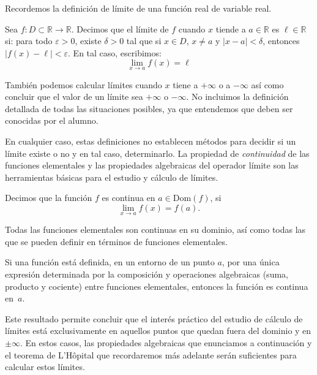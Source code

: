 Recordemos la definición de límite de una función real de variable real.
%
\begin{definicion}
Sea $f\colon D\subset\mathbb{R}\to\mathbb{R}$. Decimos que el límite de $f$ cuando $x$ tiende a $a\in\mathbb{R}$ es $\ell\in\mathbb{R}$ si: para todo $\varepsilon>0$, existe $\delta>0$ tal que si $x\in D$, $x\ne a$ y $|x-a|<\delta$, entonces
$|f(x)-\ell|<\varepsilon$.
En tal caso, escribimos:
\[
\lim_{x\to a}f(x)=\ell
\]
\end{definicion}

También podemos calcular límites cuando $x$ tiene a $+\infty$ o a $-\infty$ así como concluir que el valor de un límite sea $+\infty$ o $-\infty$.
No incluimos la definición detallada de todas las situaciones posibles, ya que entendemos que deben ser conocidas por el alumno.

En cualquier caso, estas definiciones no establecen métodos para decidir si un límite existe o no y en tal caso, determinarlo.
La propiedad de \emph{continuidad} de las funciones elementales y las propiedades algebraicas del operador límite son las herramientas básicas para el estudio y cálculo de límites.

\begin{definicion}
Decimos que la función $f$ es continua en $a\in\mathrm{Dom}(f)$, si
\[
\lim_{x\to a}f(x)=f(a).
\]
\end{definicion}

Todas las funciones elementales son continuas en su dominio, así como todas las que se pueden definir en términos de funciones elementales.
%
\begin{teorema}
Si una función está definida, en un entorno de un punto $a$,
por una única expresión determinada por la composición y operaciones algebraicas (suma, producto y cociente) entre funciones elementales, entonces la función es continua en~$a$.
\end{teorema}

Este resultado permite concluir que el interés práctico del estudio de cálculo de límites está exclusivamente en aquellos puntos que quedan fuera del dominio y en $\pm\infty$.
En estos casos, las propiedades algebraicas que enunciamos a continuación y el teorema de L'Hôpital que recordaremos más adelante serán suficientes para calcular estos límites.

